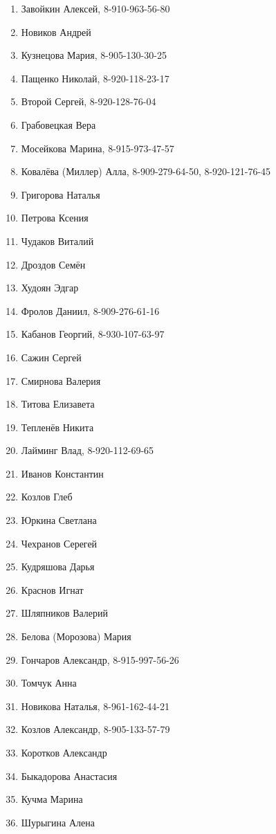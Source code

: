 \begin{enumerate}
\item Завойкин Алексей, 8-910-963-56-80
\item Новиков Андрей
\item Кузнецова Мария, 8-905-130-30-25
\item Пащенко Николай, 8-920-118-23-17
\item Второй Сергей, 8-920-128-76-04
\item Грабовецкая Вера
\item Мосейкова Марина, 8-915-973-47-57
\item Ковалёва (Миллер) Алла, 8-909-279-64-50, 8-920-121-76-45
\item Григорова Наталья
\item Петрова Ксения
\item Чудаков Виталий
\item Дроздов Семён
\item Худоян Эдгар
\item Фролов Даниил, 8-909-276-61-16
\item Кабанов Георгий, 8-930-107-63-97
\item Сажин Сергей
\item Смирнова Валерия
\item Титова Елизавета
\item Тепленёв Никита
\item Лайминг Влад, 8-920-112-69-65
\item Иванов Константин
\item Козлов Глеб
\item Юркина Светлана
\item Чехранов Серегей
\item Кудряшова Дарья
\item Краснов Игнат
\item Шляпников Валерий
\item Белова (Морозова) Мария
\item Гончаров Александр, 8-915-997-56-26
\item Томчук Анна
\item Новикова Наталья, 8-961-162-44-21
\item Козлов Александр, 8-905-133-57-79
\item Коротков Александр
\item Быкадорова Анастасия
\item Кучма Марина
\item Шурыгина Алена
\end{enumerate}
